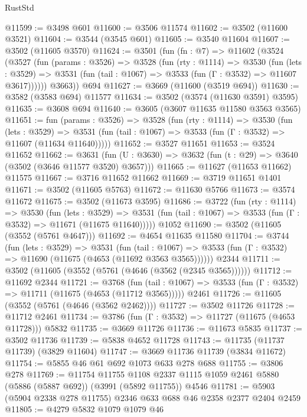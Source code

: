 \begin{lexlean}{RustStd}
\begin{coremodule}
@11599 := @3498 @601
@11600 := @3506 @11574
@11602 := @3502 (@11600 @3521)
@11604 := @3544 (@3545 @601)
@11605 := @3540 @11604
@11607 := @3502 (@11605 @3570)
@11624 := @3501
    (fun (fn : @7) =>
    @11602
      (@3524
        (@3527
          (fun (params : @3526) =>
          @3528
            (fun (rty : @1114) =>
            @3530
              (fun (lets : @3529) =>
              @3531 (fun (tail : @1067) => @3533 (fun (Γ : @3532) => @11607 @3617))))))
        @3663))
    @694
@11627 := @3669 (@11600 (@3519 @694))
@11630 := @3582 (@3583 @694) @11577
@11634 := @3502 (@3574 (@11630 @3591) @3595)
@11635 := @3608 @694
@11640 := @3605 (@3607 @11635 @11580 @3563 @3565)
@11651 := fun (params : @3526) =>
  @3528
    (fun (rty : @1114) =>
    @3530
      (fun (lets : @3529) =>
      @3531 (fun (tail : @1067) => @3533 (fun (Γ : @3532) => @11607 (@11634 @11640)))))
@11652 := @3527 @11651
@11653 := @3524 @11652
@11662 := @3631
    (fun (U : @3630) => @3632 (fun (t : @29) => @3640 (@3502 (@3646 @11577 @3520) @3657)))
@11665 := @11627 (@11653 @11662) @11575
@11667 := @3716 @11652 @11662
@11669 := @3719 @11651 @1401
@11671 := @3502 (@11605 @5763)
@11672 := @11630 @5766
@11673 := @3574 @11672
@11675 := @3502 (@11673 @3595)
@11686 := @3722
    (fun (rty : @1114) =>
    @3530
      (fun (lets : @3529) =>
      @3531 (fun (tail : @1067) => @3533 (fun (Γ : @3532) => @11671 (@11675 @11640)))))
    @1052
@11690 := @3502 (@11605 (@3552 (@5761 @4647)))
@11692 := @4654 @11635 @11580
@11704 := @3744
    (fun (lets : @3529) =>
    @3531
      (fun (tail : @1067) =>
      @3533 (fun (Γ : @3532) => @11690 (@11675 (@4653 (@11692 @3563 @3565))))))
    @2344
@11711 := @3502 (@11605 (@3552 (@5761 (@4646 (@3562 (@2345 @3565))))))
@11712 := @11692 @2344
@11721 := @3768
    (fun (tail : @1067) => @3533 (fun (Γ : @3532) => @11711 (@11675 (@4653 (@11712 @3565)))))
    @2461
@11726 := @11605 (@3552 (@5761 (@4646 (@3562 @2462))))
@11727 := @3502 @11726
@11728 := @11712 @2461
@11734 := @3786 (fun (Γ : @3532) => @11727 (@11675 (@4653 @11728))) @5832
@11735 := @3669 @11726
@11736 := @11673 @5835
@11737 := @3502 @11736
@11739 := @5838 @4652 @11728
@11743 := @11735 (@11737 @11739) (@3829 @11604)
@11747 := @3669 @11736 @11739 (@3834 @11672)
@11754 := @5855 @46 @61 @692 @1073 @633 @278 @688
@11755 := @3806 @278
@11769 := @11754
    @11755
    @1108
    @2337
    @1115
    @1059
    @2461
    @5880
    (@5886 (@5887 @692))
    (@3991 (@5892 @11755))
    @4546
@11781 := @5903 (@5904 @2338 @278 @11755) @2346 @633 @688 @46 @2358 @2377 @2404 @2459
@11805 := @4279
    @5832
    @1079
    @1079
    @46

\end{coremodule}
\end{lexlean}

